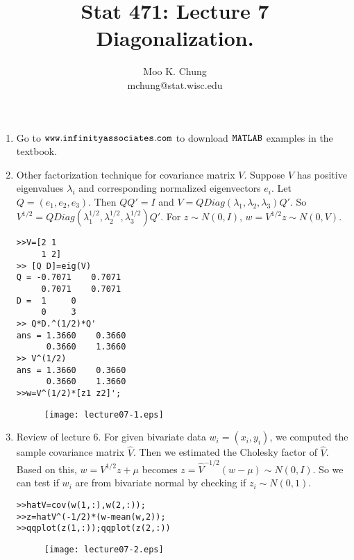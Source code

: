 \documentclass[10pt,twocolumn]{article} %
\begin{document}
\title{Stat 471: Lecture 7\\
Diagonalization.}
\author{Moo K. Chung\\
mchung@stat.wisc.edu}
\maketitle \thispagestyle{empty}

\begin{enumerate}

\item Go to ${\tt www.infinityassociates.com}$ to download ${\tt
MATLAB}$ examples in the textbook.


\item Other factorization technique for covariance matrix $V$.
Suppose $V$ has positive eigenvalues $\lambda_i$ and corresponding
normalized eigenvectors $e_i$. Let $Q=(e_1,e_2,e_3)$. Then $QQ'=I$
and $V=QDiag(\lambda_1, \lambda_2, \lambda_3)Q'.$ So
$V^{1/2}=QDiag(\lambda_1^{1/2}, \lambda_2^{1/2},
\lambda_3^{1/2})Q'.$ For $z \sim N(0,I)$, $w=V^{1/2}z \sim
N(0,V)$.
\begin{verbatim}
>>V=[2 1
     1 2]
>> [Q D]=eig(V)
Q = -0.7071    0.7071
     0.7071    0.7071
D =  1     0
     0     3
>> Q*D.^(1/2)*Q'
ans = 1.3660    0.3660
      0.3660    1.3660
>> V^(1/2)
ans = 1.3660    0.3660
      0.3660    1.3660
>>w=V^(1/2)*[z1 z2]';
\end{verbatim}


\begin{figure}
\centering
\renewcommand{\baselinestretch}{1}
\texttt{[image: lecture07-1.eps]}
\end{figure}

\item Review of lecture 6. For given bivariate data
$w_i=(x_i,y_i)$, we computed the sample covariance matrix $\hat
V$. Then we estimated the Cholesky factor of $\hat V$. Based on
this, $w=V^{1/2}z + \mu$ becomes $z=\hat V^{-1/2}(w-\mu) \sim
N(0,I)$. So we can test if $w_i$ are from bivariate normal by
checking if $z_i \sim N(0,1)$.

\begin{verbatim}
>>hatV=cov(w(1,:),w(2,:));
>>z=hatV^(-1/2)*(w-mean(w,2));
>>qqplot(z(1,:));qqplot(z(2,:))
\end{verbatim}



\begin{figure}
\centering
\renewcommand{\baselinestretch}{1}
\texttt{[image: lecture07-2.eps]}
\end{figure}


\end{enumerate}
\end{document}
